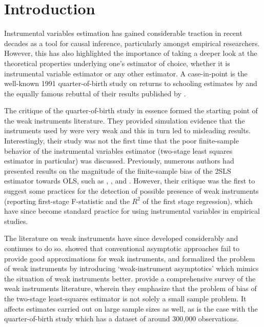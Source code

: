 \section{Introduction} Instrumental variables estimation has gained considerable traction in recent decades as a tool for causal inference, particularly amongst empirical researchers. However, this has also highlighted the importance of taking a deeper look at the theoretical properties underlying one's estimator of choice, whether it is instrumental variable estimator or any other estimator. A case-in-point is the well-known 1991 quarter-of-birth study on returns to schooling estimates by \cite{angrist1991does} and the equally famous rebuttal of their results published by \cite{bound1995problems}.

\par The \cite{bound1995problems} critique of the quarter-of-birth study in essence formed the starting point of the weak instruments literature. They provided simulation evidence that the instruments used by \cite{angrist1991does} were very weak and this in turn led to misleading results. Interestingly, their study was not the first time that the poor finite-sample behavior of the instrumental variables estimator (two-stage least squares estimator in particular) was discussed. Previously, numerous authors had presented results on the magnitude of the finite-sample bias of the 2SLS estimator towards OLS, such as \cite{nagar1959bias}, \cite{basmann1960asymptotic}, \cite{richardson1968exact} and \cite{sawa1969exact}.
However, their critique was the first to suggest some practices for the detection of possible presence of weak instruments (reporting first-stage F-statistic and the $R^2$ of the first stage regression), which have since become standard practice for using instrumental variables in empirical studies.

\par The literature on weak instruments have since developed considerably and continues to do so. \cite{staiger1997stock} showed that conventional asymptotic approaches fail to provide good approximations for weak instruments, and formalized the problem of weak instruments by introducing `weak-instrument asymptotics' which mimics the situation of weak instruments better. \cite{stock2002survey} provide a comprehensive survey of the weak instruments literature, wherein they emphasize that the problem of bias of the two-stage least-squares estimator is not
solely a small sample problem. It affects estimates carried out on large sample sizes as well, as is the case with the quarter-of-birth study which has a dataset of around 300,000 observations.

